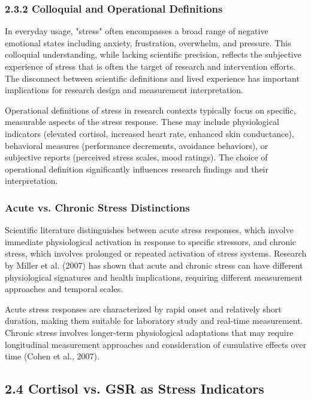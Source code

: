 \documentclass[11pt,a4paper]{article}
\begin{document}
\subsubsection{2.3.2 Colloquial and Operational Definitions}

In everyday usage, "stress" often encompasses a broad range of negative emotional states including anxiety, frustration,
overwhelm, and pressure. This colloquial understanding, while lacking scientific precision, reflects the subjective
experience of stress that is often the target of research and intervention efforts. The disconnect between scientific
definitions and lived experience has important implications for research design and measurement interpretation.

Operational definitions of stress in research contexts typically focus on specific, measurable aspects of the stress
response. These may include physiological indicators (elevated cortisol, increased heart rate, enhanced skin
conductance), behavioral measures (performance decrements, avoidance behaviors), or subjective reports (perceived stress
scales, mood ratings). The choice of operational definition significantly influences research findings and their
interpretation.

\subsubsection{Acute vs. Chronic Stress Distinctions}

Scientific literature distinguishes between acute stress responses, which involve immediate physiological activation in
response to specific stressors, and chronic stress, which involves prolonged or repeated activation of stress systems.
Research by Miller et al. (2007) has shown that acute and chronic stress can have different physiological signatures and
health implications, requiring different measurement approaches and temporal scales.

Acute stress responses are characterized by rapid onset and relatively short duration, making them suitable for
laboratory study and real-time measurement. Chronic stress involves longer-term physiological adaptations that may
require longitudinal measurement approaches and consideration of cumulative effects over time (Cohen et al., 2007).

\subsection{2.4 Cortisol vs. GSR as Stress Indicators}
\end{document}
